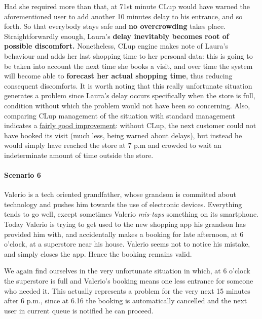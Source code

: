 Had she required more than that, at 71st minute CLup would have warned the aforementioned user to add another 10 minutes delay to his entrance, and so forth. So that everybody stays safe and \textbf{no overcrowding} takes place.\newline
Straightforwardly enough, Laura's \textbf{delay inevitably becomes root of possible discomfort.} Nonetheless, CLup engine makes note of Laura's behaviour and adds her last shopping time to her personal data: this is going to be taken into account the next time she books a visit, and over time the system will become able to \textbf{forecast her actual shopping time}, thus reducing consequent discomforts.\newline
It is worth noting that this really unfortunate situation generates a problem since Laura's delay occurs specifically when the store is full, condition without which the problem would not have been so concerning.\newline
Also, comparing CLup management of the situation with standard management indicates a \underline{fairly good improvement}: without CLup, the next customer could not have booked its visit (much less, being warned about delays), but instead he would simply have reached the store at 7 p.m and crowded to wait an indeterminate amount of time outside the store.

\paragraph{Scenario 6}
Valerio is a tech oriented grandfather, whose grandson is committed about technology and pushes him towards the use of electronic devices.\newline
Everything tends to go well, except sometimes Valerio \textit{mis-taps} something on its smartphone. Today Valerio is trying to get used to the new shopping app his grandson has provided him with, and accidentally makes a booking for late afternoon, at 6 o'clock, at a superstore near his house.\newline
Valerio seems not to notice his mistake, and simply closes the app. Hence the booking remains valid.

We again find ourselves in the very unfortunate situation in which, at 6 o'clock the superstore is full and Valerio's booking means one less entrance for someone who needed it. This actually represents a problem for the very next 15 minutes after 6 p.m., since at 6.16 the booking is automatically cancelled and the next user in current queue is notified he can proceed. 

